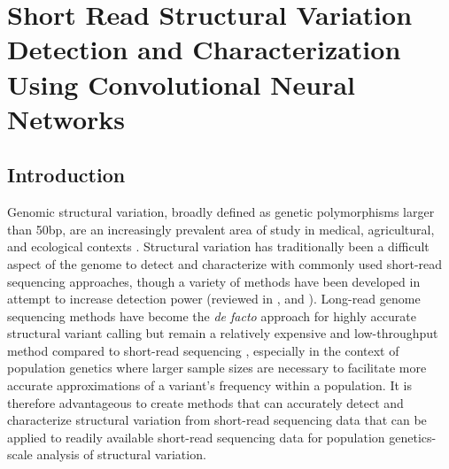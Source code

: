 \chapter{Short Read Structural Variation Detection and Characterization Using Convolutional Neural Networks}

\section{Introduction}

Genomic structural variation, broadly defined as genetic polymorphisms larger than 50bp, are an increasingly prevalent area of study in medical, agricultural, and ecological contexts \cite{sudmantIntegratedMapStructural2015,duAnalysisStructuralVariants2021,weissensteinerDiscoveryPopulationGenomics2020,chakrabortyEvolutionGenomeStructure2021,chakrabortyHiddenGeneticVariation2018,merkerLongreadGenomeSequencing2018,bickhartChallengesImportanceStructural2014}. Structural variation has traditionally been a difficult aspect of the genome to detect and characterize with commonly used short-read sequencing approaches, though a variety of methods have been developed in attempt to increase detection power \cite{clealDysguEfficientStructural2022,rauschDELLYStructuralVariant2012,chenMantaRapidDetection2016,belyeuSamplotPlatformStructural2021,popicCueDeeplearningFramework2023}(reviewed in \cite{cameronComprehensiveEvaluationCharacterisation2019}, \cite{mahmoudStructuralVariantCalling2019} and \cite{alkanGenomeStructuralVariation2011}). Long-read genome sequencing methods have become the \textit{de facto} approach for highly accurate structural variant calling but remain a relatively expensive and low-throughput method compared to short-read sequencing \cite{merkerLongreadGenomeSequencing2018,dierckxsensBenchmarkStructuralVariation2021,chenDecipheringExactBreakpoints2023,ahsanSurveyAlgorithmsDetection2023,decosterPopulationscaleLongreadSequencing2021}, especially in the context of population genetics where larger sample sizes are necessary to facilitate more accurate approximations of a variant's frequency within a population. It is therefore advantageous to create methods that can accurately detect and characterize structural variation from short-read sequencing data that can be applied to readily available short-read sequencing data for population genetics-scale analysis of structural variation.

